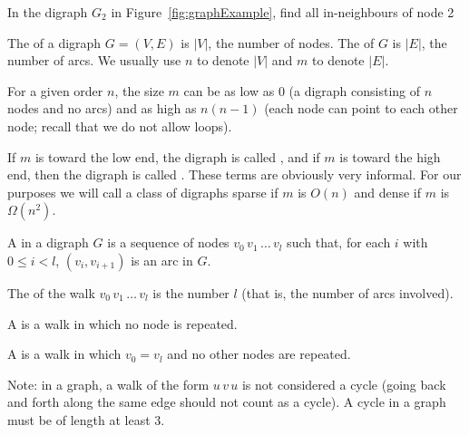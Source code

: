 \beginboxedexample
In the digraph $G_2$  in Figure~\ref{fig:graphExample}, find all in-neighbours of node 2 
\endboxedexample{2cm}


%





\begin{Definition} 
The  of a digraph $G=(V,E)$ is $|V|$, the number of nodes. 
The  of $G$ is $|E|$, the number of arcs. We usually use $n$ to denote $|V|$ and $m$ to denote
$|E|$.

\end{Definition}
 

For a given order $n$, the size $m$ can be as low as $0$ (a digraph
consisting of $n$ nodes and no arcs)  and as high as
$n(n-1)$ (each node can point to each other node; recall that we do
not allow loops).

\begin{Definition}  If $m$ is toward the low end, the digraph is called
, and if $m$ is toward the high end, then the digraph
is called . These terms are obviously very informal. For
our purposes we will call a class of digraphs sparse if $m$ is $O(n)$
and dense if $m$ is $\Omega(n^2)$.
\end{Definition}


\begin{Definition} 
A  in a digraph $G$ is a sequence of nodes $v_0\, v_1\,
\ldots\, v_l$ such that, for each $i$ with $0 \leq i < l$, $(v_i,
v_{i+1})$ is an arc in $G$. 

The  of the walk $v_0\, v_1\,
\ldots \,v_l$ is the number $l$ (that is, the number of arcs involved).

A  is a walk in which no node is repeated. 

A  is a walk in which $v_0 = v_l$ and no other nodes
are repeated.
\end{Definition}

Note: in a graph, a walk of the form $u\, v\, u$ is not considered a cycle (going back and forth along the same edge should not count as a
cycle). A cycle in a graph must be of length at least $3$.


